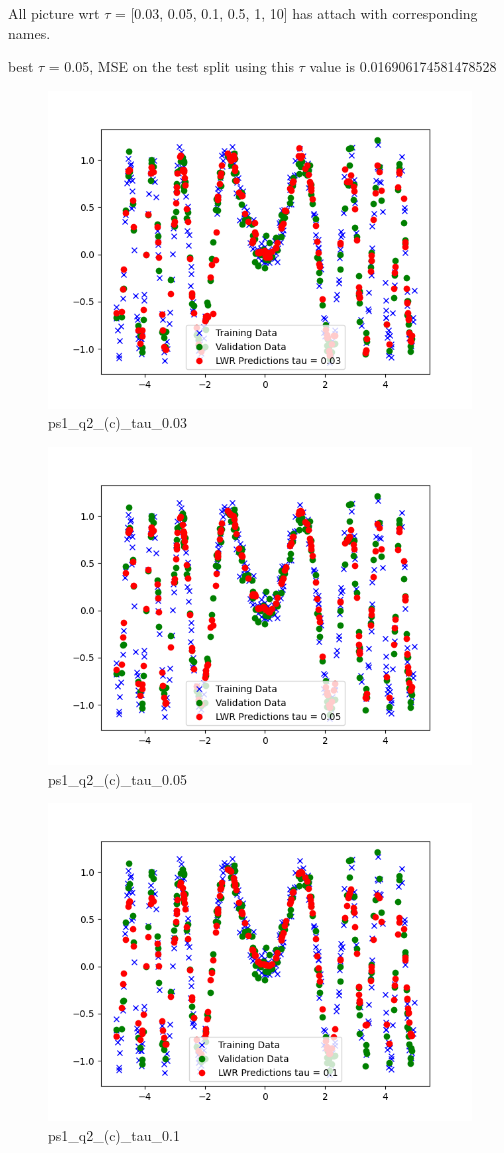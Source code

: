 \begin{answer}


All picture wrt $\tau$ = [0.03, 0.05, 0.1, 0.5, 1, 10] has attach with corresponding names.


best $\tau$ = 0.05, MSE on the test split using this $\tau$ value is 0.016906174581478528

\begin{figure}
    \centering
    \includegraphics[width=0.5\linewidth]{ps1_q2_(c)_tau_0.03.png}
    \caption{ps1\_q2\_(c)\_tau\_0.03}
    \label{fig:enter-label}
\end{figure}

\begin{figure}
    \centering
    \includegraphics[width=0.5\linewidth]{ps1_q2_(c)_tau_0.05.png}
    \caption{ps1\_q2\_(c)\_tau\_0.05}
    \label{fig:enter-label}
\end{figure}

\begin{figure}
    \centering
    \includegraphics[width=0.5\linewidth]{ps1_q2_(c)_tau_0.1.png}
    \caption{ps1\_q2\_(c)\_tau\_0.1}
    \label{fig:enter-label}
\end{figure}


\end{answer}
